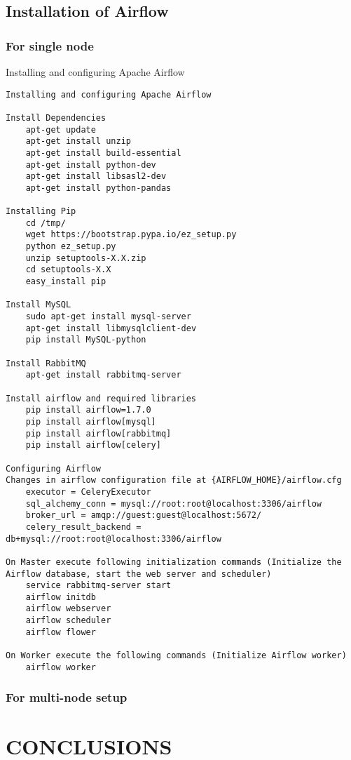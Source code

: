 \documentclass[10pt,onecolumn]{IEEEtran}
\begin{document}
\subsection{Installation of Airflow}
\subsubsection{For single node}

Installing and configuring Apache Airflow
\begin{verbatim}
Installing and configuring Apache Airflow

Install Dependencies
	apt-get update
	apt-get install unzip
	apt-get install build-essential
	apt-get install python-dev
	apt-get install libsasl2-dev
	apt-get install python-pandas	

Installing Pip
	cd /tmp/
	wget https://bootstrap.pypa.io/ez_setup.py
	python ez_setup.py
	unzip setuptools-X.X.zip
	cd setuptools-X.X
	easy_install pip

Install MySQL
	sudo apt-get install mysql-server
	apt-get install libmysqlclient-dev
	pip install MySQL-python

Install RabbitMQ
	apt-get install rabbitmq-server

Install airflow and required libraries
	pip install airflow=1.7.0
	pip install airflow[mysql]
	pip install airflow[rabbitmq]
	pip install airflow[celery]

Configuring Airflow
Changes in airflow configuration file at {AIRFLOW_HOME}/airflow.cfg
	executor = CeleryExecutor
	sql_alchemy_conn = mysql://root:root@localhost:3306/airflow
	broker_url = amqp://guest:guest@localhost:5672/
	celery_result_backend = db+mysql://root:root@localhost:3306/airflow

On Master execute following initialization commands (Initialize the Airflow database, start the web server and scheduler)
	service rabbitmq-server start
	airflow initdb
	airflow webserver
	airflow scheduler
	airflow flower

On Worker execute the following commands (Initialize Airflow worker)
	airflow worker
\end{verbatim}

\subsubsection{For multi-node setup}
\section{CONCLUSIONS}
\end{document}
